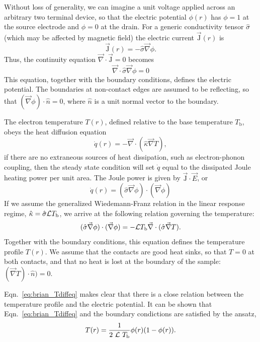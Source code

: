 Without loss of generality, we can imagine a unit voltage applied across an arbitrary two terminal device, so that the electric potential $\phi (r)$ has $\phi = 1$ at the source electrode and $\phi = 0$ at the drain. For a generic conductivity tensor $\hat\sigma$ (which may be affected by magnetic field) the electric current $\vec{\mathrm{J}}(r)$ is
\begin{equation}
\vec{\mathrm{J}}(r) = -\hat\sigma\vec\nabla\phi .
\end{equation}
Thus, the continuity equation $\vec\nabla\cdot\vec{\mathrm{J}}=0$ becomes
\begin{equation}
\vec\nabla\cdot\hat\sigma\vec\nabla\phi=0
\end{equation}
This equation, together with the boundary conditions, defines the electric potential. The boundaries at non-contact edges are assumed to be reflecting, so that $(\vec\nabla\phi)\cdot\hat{n}=0$, where $\hat{n}$ is a unit normal vector to the boundary.

The electron temperature $T(r)$, defined relative to the base temperature $T_\mathrm{b}$, obeys the heat diffusion equation
\begin{equation}
\dot{q}(r) = -\vec\nabla\cdot(\hat\kappa\vec\nabla T),
\end{equation}
if there are no extraneous sources of heat dissipation, such as electron-phonon coupling, then the steady state condition will set $\dot{q}$  equal to the dissipated Joule heating power per unit area. The Joule power is given by $\vec{\mathrm{J}}\cdot\vec{E}$, or
\begin{equation}
\dot{q}(r) = (\hat\sigma\vec\nabla\phi)\cdot(\vec\nabla\phi)
\label{eq:brian_qdot}
\end{equation}
If we assume the generalized Wiedemann-Franz relation in the linear response regime, $\hat\kappa = \hat\sigma\mathcal{L} T_\mathrm{b}$, we arrive at the following relation governing the temperature:
\begin{equation}\label{eq:brian_Tdiffeq}
(\hat\sigma\vec\nabla\phi)\cdot(\vec\nabla\phi) = -\mathcal{L} T_\mathrm{b}\vec\nabla\cdot(\hat\sigma\vec\nabla T).
\end{equation}
Together with the boundary conditions, this equation defines the temperature profile $T(r)$. We assume that the contacts are good heat sinks, so that $T = 0$ at both contacts,
and that no heat is lost at the boundary of the sample: $(\vec\nabla T)\cdot\hat{n}) = 0$.

Eqn.~\ref{eq:brian_Tdiffeq} makes clear that there is a close relation between the temperature profile and the electric potential. It can be shown that Eqn.~\ref{eq:brian_Tdiffeq} and the boundary condictions are satisfied by the ansatz,
\begin{equation}\label{eq:brian_Tprofile}
T(r)=\frac{1}{2~\mathcal{L}~T_\mathrm{b}}\phi(r)(1-\phi(r)).
\end{equation}

